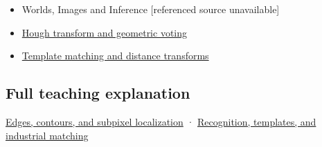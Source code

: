 \begin{itemize}
\tightlist
\item
  {Worlds, Images and Inference {[}referenced source unavailable{]}}
\item
  \hyperref[appendix-a5b0383b3b3e]{Hough transform and geometric voting}
\item
  \hyperref[appendix-5fb4af80d1c7]{Template matching and distance transforms}
\end{itemize}

\subsection{Full teaching explanation}\label{appendix-36022286b03e-full-teaching-explanation}

\hyperref[04-visual-computing-ii-ch030-edges-contours-and-subpixel-localization]{Edges, contours, and subpixel localization} · \hyperref[04-visual-computing-ii-ch030-recognition-templates-and-industrial-matching]{Recognition, templates, and industrial matching}

